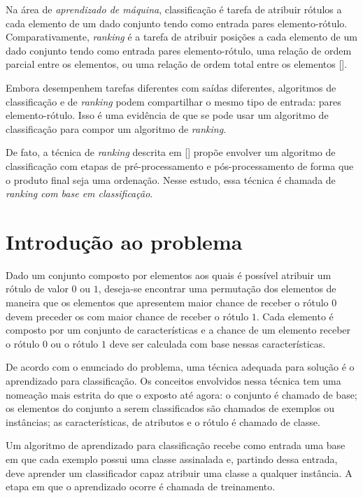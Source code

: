 Na área de \emph{aprendizado de máquina}, classificação é tarefa de atribuir rótulos a cada elemento de um dado conjunto tendo como entrada pares elemento-rótulo. Comparativamente, \emph{ranking} é a tarefa de atribuir posições a cada elemento de um dado conjunto tendo como entrada pares elemento-rótulo, uma relação de ordem parcial entre os elementos, ou uma relação de ordem total entre os elementos [\cite{tieyan09}].

Embora desempenhem tarefas diferentes com saídas diferentes, algoritmos de classificação e de \emph{ranking} podem compartilhar o mesmo tipo de entrada: pares elemento-rótulo. Isso é uma evidência de que se pode usar um algoritmo de classificação para compor um algoritmo de \emph{ranking}.

De fato, a técnica de \emph{ranking} descrita em [\cite{langford08}] propõe envolver  um algoritmo de classificação com etapas de pré-processamento e pós-processamento de forma que o produto final seja uma ordenação. Nesse estudo, essa técnica é chamada de \emph{ranking com base em classificação}.

\section{Introdução ao problema}

Dado um conjunto composto por elementos aos quais é possível atribuir um rótulo de valor $0$ ou $1$, deseja-se encontrar uma permutação dos elementos de maneira que os elementos que apresentem maior chance de receber o rótulo $0$ devem preceder os com maior chance de receber o rótulo $1$. Cada elemento é composto por um conjunto de características e a chance de um elemento receber o rótulo $0$ ou o rótulo $1$ deve ser calculada com base nessas características.

De acordo com o enunciado do problema, uma técnica adequada para solução é o aprendizado para classificação. Os conceitos envolvidos nessa técnica tem uma nomeação mais estrita do que o exposto até agora: o conjunto é chamado de base; os elementos do conjunto a serem classificados são chamados de exemplos ou instâncias; as características, de atributos e o rótulo é chamado de classe.

Um algoritmo de aprendizado para classificação recebe como entrada uma base em que cada exemplo possui uma classe assinalada e, partindo dessa entrada, deve aprender um classificador capaz atribuir uma classe a qualquer instância. A etapa em que o aprendizado ocorre é chamada de treinamento.

